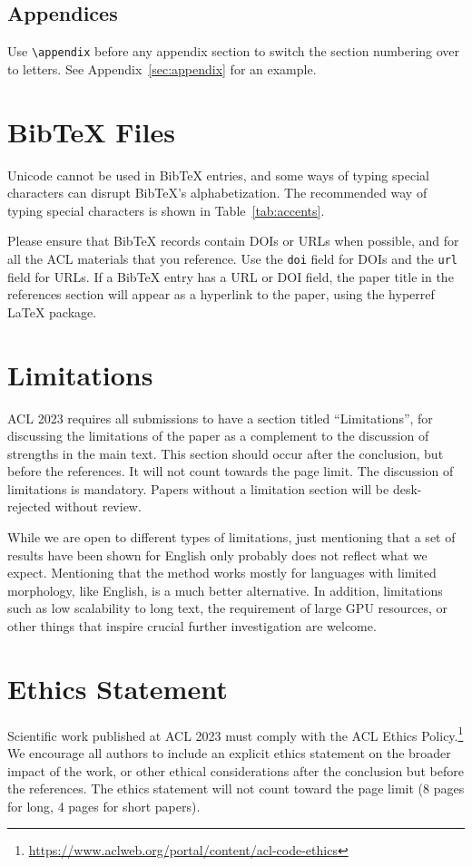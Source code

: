 \documentclass[11pt]{article}
\begin{document}
\subsection{Appendices}

Use \verb|\appendix| before any appendix section to switch the section numbering over to letters. See Appendix~\ref{sec:appendix} for an example.

\section{Bib\TeX{} Files}
\label{sec:bibtex}

Unicode cannot be used in Bib\TeX{} entries, and some ways of typing special characters can disrupt Bib\TeX's alphabetization. The recommended way of typing special characters is shown in Table~\ref{tab:accents}.

Please ensure that Bib\TeX{} records contain DOIs or URLs when possible, and for all the ACL materials that you reference.
Use the \verb|doi| field for DOIs and the \verb|url| field for URLs.
If a Bib\TeX{} entry has a URL or DOI field, the paper title in the references section will appear as a hyperlink to the paper, using the hyperref \LaTeX{} package.

\section*{Limitations}
ACL 2023 requires all submissions to have a section titled ``Limitations'', for discussing the limitations of the paper as a complement to the discussion of strengths in the main text. This section should occur after the conclusion, but before the references. It will not count towards the page limit.
The discussion of limitations is mandatory. Papers without a limitation section will be desk-rejected without review.

While we are open to different types of limitations, just mentioning that a set of results have been shown for English only probably does not reflect what we expect.
Mentioning that the method works mostly for languages with limited morphology, like English, is a much better alternative.
In addition, limitations such as low scalability to long text, the requirement of large GPU resources, or other things that inspire crucial further investigation are welcome.

\section*{Ethics Statement}
Scientific work published at ACL 2023 must comply with the ACL Ethics Policy.\footnote{\url{https://www.aclweb.org/portal/content/acl-code-ethics}} We encourage all authors to include an explicit ethics statement on the broader impact of the work, or other ethical considerations after the conclusion but before the references. The ethics statement will not count toward the page limit (8 pages for long, 4 pages for short papers).
\end{document}
